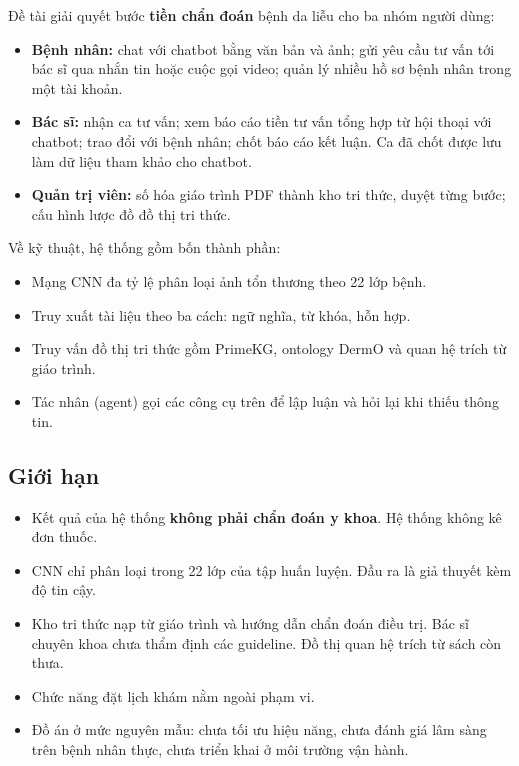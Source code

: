 Đề tài giải quyết bước \textbf{tiền chẩn đoán} bệnh da liễu cho ba nhóm người dùng:
\begin{itemize}
  \item \textbf{Bệnh nhân:} chat với chatbot bằng văn bản và ảnh; gửi yêu cầu tư vấn tới bác sĩ qua nhắn tin hoặc cuộc gọi video; quản lý nhiều hồ sơ bệnh nhân trong một tài khoản.
  \item \textbf{Bác sĩ:} nhận ca tư vấn; xem báo cáo tiền tư vấn tổng hợp từ hội thoại với chatbot; trao đổi với bệnh nhân; chốt báo cáo kết luận. Ca đã chốt được lưu làm dữ liệu tham khảo cho chatbot.
  \item \textbf{Quản trị viên:} số hóa giáo trình PDF thành kho tri thức, duyệt từng bước; cấu hình lược đồ đồ thị tri thức.
\end{itemize}

Về kỹ thuật, hệ thống gồm bốn thành phần:
\begin{itemize}
  \item Mạng CNN đa tỷ lệ phân loại ảnh tổn thương theo 22 lớp bệnh.
  \item Truy xuất tài liệu theo ba cách: ngữ nghĩa, từ khóa, hỗn hợp.
  \item Truy vấn đồ thị tri thức gồm PrimeKG, ontology DermO và quan hệ trích từ giáo trình.
  \item Tác nhân (agent) gọi các công cụ trên để lập luận và hỏi lại khi thiếu thông tin.
\end{itemize}

\subsection{Giới hạn}

\begin{itemize}
  \item Kết quả của hệ thống \textbf{không phải chẩn đoán y khoa}. Hệ thống không kê đơn thuốc.
  \item CNN chỉ phân loại trong 22 lớp của tập huấn luyện. Đầu ra là giả thuyết kèm độ tin cậy.
  \item Kho tri thức nạp từ giáo trình và hướng dẫn chẩn đoán điều trị. Bác sĩ chuyên khoa chưa thẩm định các guideline. Đồ thị quan hệ trích từ sách còn thưa.
  \item Chức năng đặt lịch khám nằm ngoài phạm vi.
  \item Đồ án ở mức nguyên mẫu: chưa tối ưu hiệu năng, chưa đánh giá lâm sàng trên bệnh nhân thực, chưa triển khai ở môi trường vận hành.
\end{itemize}


